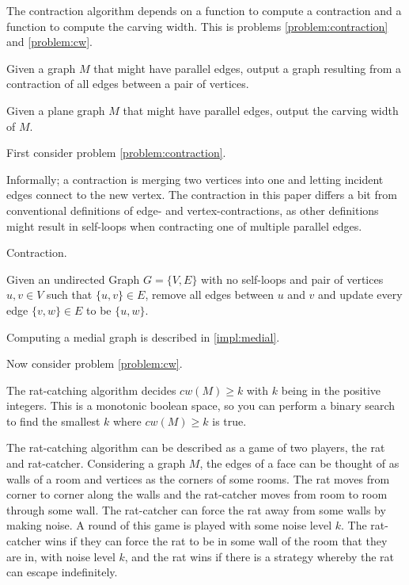 \documentclass{article}
\begin{document}
	The contraction algorithm depends on a function to compute a contraction and a function to compute the carving width. This is problems \ref{problem:contraction} and \ref{problem:cw}.

	\begin{problem}\label{problem:contraction}
		Given a graph $M$ that might have parallel edges, output a graph resulting from a contraction of all edges between a pair of vertices.
	\end{problem}

	\begin{problem}\label{problem:cw}
		Given a plane graph $M$ that might have parallel edges, output the carving width of $M$.
	\end{problem}

	First consider problem \ref{problem:contraction}.

	Informally; a contraction is merging two vertices into one and letting incident edges connect to the new vertex. The contraction in this paper differs a bit from conventional definitions of edge- and vertex-contractions, as other definitions might result in self-loops when contracting one of multiple parallel edges.

	\begin{definition}
		Contraction.

		Given an undirected Graph $G=\{V,E\}$ with no self-loops and pair of vertices $u,v \in V$ such that $\{u,v\} \in E$, remove all edges between $u$ and $v$ and update every edge $\{v,w\} \in E$ to be $\{u,w\}$.
	\end{definition}

	Computing a medial graph is described in \ref{impl:medial}.

	Now consider problem \ref{problem:cw}.

	The rat-catching algorithm decides $cw(M) \geq k$ with $k$ being in the positive integers. This is a monotonic boolean space, so you can perform a binary search to find the smallest $k$ where $cw(M) \geq k$ is true.

	The rat-catching algorithm can be described as a game of two players, the rat and rat-catcher. Considering a graph $M$, the edges of a face can be thought of as walls of a room and vertices as the corners of some rooms. The rat moves from corner to corner along the walls and the rat-catcher moves from room to room through some wall. The rat-catcher can force the rat away from some walls by making noise. A round of this game is played with some noise level $k$. The rat-catcher wins if they can force the rat to be in some wall of the room that they are in, with noise level $k$, and the rat wins if there is a strategy whereby the rat can escape indefinitely.
\end{document}
